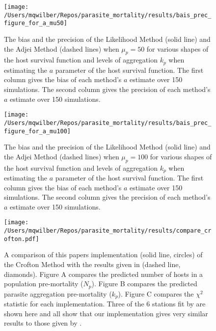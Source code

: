 \documentclass[12pt, a4paper]{article}
\begin{document}
\begin{figure}

    \texttt{[image: /Users/mqwilber/Repos/parasite\_mortality/results/bais\_prec\_figure\_for\_a\_mu50]}

    \caption{The bias and the precision of the Likelihood Method (solid line) and the Adjei Method (dashed lines) when $\mu_p = 50$ for various shapes of the host survival function and levels of aggregation $k_p$ when estimating the $a$ parameter of the host survival function.  The first column gives the bias of each method's $a$ estimate over 150 simulations. The second column gives the precision of each method's $a$ estimate over 150 simulations.}

    \label{fig:biasa_50}

\end{figure}

\begin{figure}

    \texttt{[image: /Users/mqwilber/Repos/parasite\_mortality/results/bais\_prec\_figure\_for\_a\_mu100]}

    \caption{The bias and the precision of the Likelihood Method (solid line) and the Adjei Method (dashed lines) when $\mu_p = 100$ for various shapes of the host survival function and levels of aggregation $k_p$ when estimating the $a$ parameter of the host survival function.  The first column gives the bias of each method's $a$ estimate over 150 simulations. The second column gives the precision of each method's $a$ estimate over 150 simulations.}

    \label{fig:biasa_100}

\end{figure}

\begin{figure}
    \centering
    \texttt{[image: /Users/mqwilber/Repos/parasite\_mortality/results/compare\_crofton.pdf]}
    \caption{A comparison of this papers implementation (solid line, circles) of the Crofton Method with the results given in \cite{Crofton1971a} (dashed line, diamonds).  Figure A compares the predicted number of hosts in a population pre-mortality ($N_p$). Figure B compares the predicted parasite aggregation pre-mortality ($k_p$).  Figure C compares the $\chi^2$ statistic for each implementation.  Three of the 6 stations fit by \citeauthor{Crofton1971a} are shown here and all show that our implementation gives very similar results to those given by \citeauthor{Crofton1971a}.}
    \label{fig:crof_test}

\end{figure}
\end{document}
